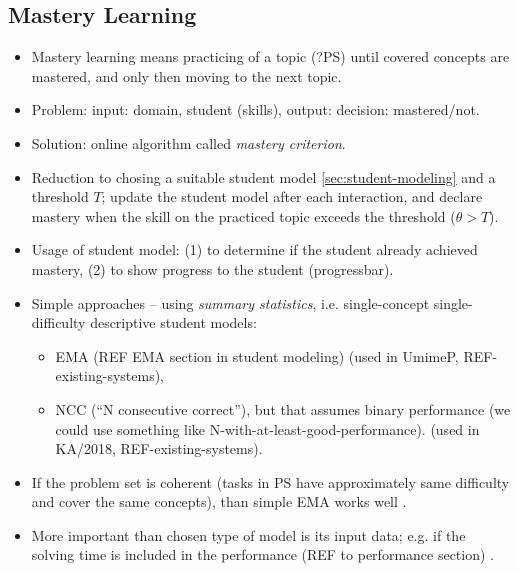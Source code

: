 \subsection{Mastery Learning}
\label{sec:mastery-learning}

\begin{itemize}
\item Mastery learning means practicing of a topic (?PS) until covered concepts
  are mastered, and only then moving to the next topic.
\item Problem: input: domain, student (skills), output: decision: mastered/not.
\item Solution: online algorithm called \emph{mastery criterion}.
\item Reduction to chosing a suitable student model \ref{sec:student-modeling}
  and a threshold $T$;
  update the student model after each interaction,
  and declare mastery when the skill
  on the practiced topic exceeds the threshold
  ($\theta > T$).
\item Usage of student model:
  (1) to determine if the student already achieved mastery,
  (2) to show progress to the student (progressbar).
\item Simple approaches -- using \emph{summary statistics}, i.e.
  single-concept single-difficulty descriptive student models:  %
\begin{itemize}
\item EMA (REF EMA section in student modeling) (used in UmimeP, REF-existing-systems),
\item NCC (``N consecutive correct''), but that assumes binary performance
  (we could use something like N-with-at-least-good-performance).
  (used in KA/2018, REF-existing-systems).
\end{itemize}
\item If the problem set is coherent (tasks in PS have approximately same difficulty
  and cover the same concepts), than simple EMA works well \cite{alg.mastery}.
\item More important than chosen type of model is its input data;
  e.g. if the solving time is included in the performance (REF to performance section)
  \cite{alg.mastery}. %

\end{itemize}
